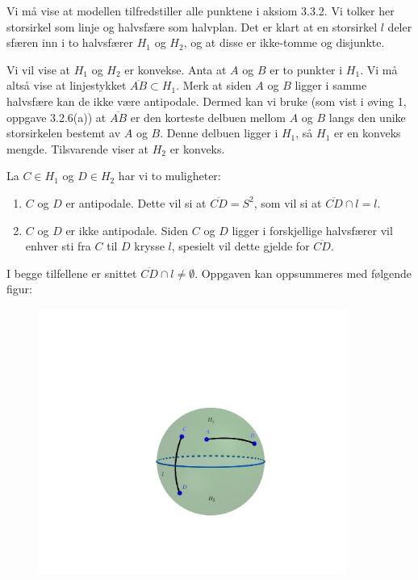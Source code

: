\begin{oppgave}[3.3.4]
  \begin{punkt}
    Vi må vise at modellen tilfredstiller alle punktene i aksiom 3.3.2. Vi tolker her storsirkel som
    linje og halvsfære som halvplan. Det er klart at en storsirkel $l$ deler sfæren inn i to halvsfærer
    $H_1$ og $H_2$, og at disse er ikke-tomme og disjunkte. 

    Vi vil vise at $H_1$ og $H_2$ er konvekse. Anta at $A$ og $B$ er to punkter i $H_1$. Vi må altså 
    vise at linjestykket $\overline{AB}\subset H_1$. Merk at siden $A$ og $B$ ligger i samme halvsfære
    kan de ikke være antipodale. Dermed kan vi bruke (som vist i øving 1, oppgave 3.2.6(a)) at
    $\overline{AB}$ er den korteste delbuen mellom $A$ og $B$ langs den unike storsirkelen bestemt av 
    $A$ og $B$. Denne delbuen ligger i $H_1$, så $H_1$ er en konveks mengde. Tilsvarende viser at $H_2$
    er konveks. 

    La $C\in H_1$ og $D\in H_2$ har vi to muligheter: 
    \begin{enumerate}
      \item $C$ og $D$ er antipodale. Dette vil si at $\overline{CD} = S^2$, som vil si at
      $\overline{CD}\cap l = l$. 

      \item $C$ og $D$ er ikke antipodale. Siden $C$ og $D$ ligger i forskjellige halvsfærer vil 
      enhver sti fra $C$ til $D$ krysse $l$, spesielt vil dette gjelde for $\overline{CD}$. 
    \end{enumerate}

    I begge tilfellene er snittet $\overline{CD}\cap l\neq \emptyset$. Oppgaven kan oppsummeres med
    følgende figur: 
    \begin{figure}[H]
      \centering 
      \includegraphics[trim={13cm 13cm 12cm 22cm},clip, width=0.9\textwidth]{oving_2/334a.png}
    \end{figure}
    

\end{punkt}
\end{oppgave}

